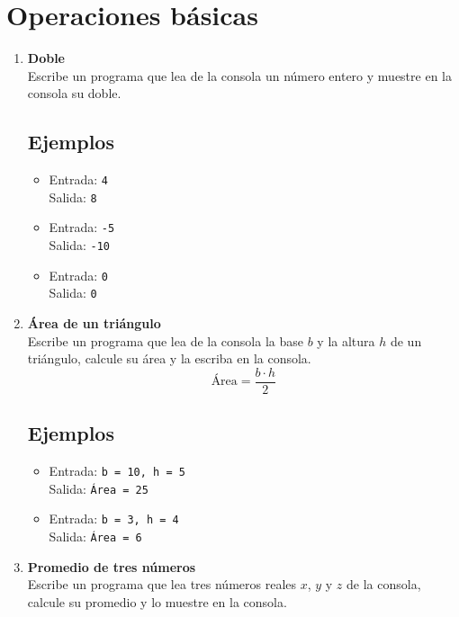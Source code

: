 \section{Operaciones básicas}
\begin{enumerate}
    \item \textbf{Doble}\\
    Escribe un programa que lea de la consola un número entero y muestre en la consola su doble.
    \subsection*{Ejemplos}
    \begin{itemize}
        \item Entrada: \texttt{4}\\
              Salida: \texttt{8}
        \item Entrada: \texttt{-5}\\
              Salida: \texttt{-10}
        \item Entrada: \texttt{0}\\
              Salida: \texttt{0}
    \end{itemize}
    
    \item \textbf{Área de un triángulo}\\
    Escribe un programa que lea de la consola la base \(b\) y la altura \(h\) de un triángulo, calcule su área y la escriba en la consola.\\
    \[
    \text{Área} = \frac{b \cdot h}{2}
    \]
    \subsection*{Ejemplos}
    \begin{itemize}
        \item Entrada: \texttt{b = 10, h = 5}\\
              Salida: \texttt{Área = 25}
        \item Entrada: \texttt{b = 3, h = 4}\\
              Salida: \texttt{Área = 6}
    \end{itemize}

    \item \textbf{Promedio de tres números}\\
    Escribe un programa que lea tres números reales \(x\), \(y\) y \(z\) de la consola, calcule su promedio y lo muestre en la consola.

\end{enumerate}
